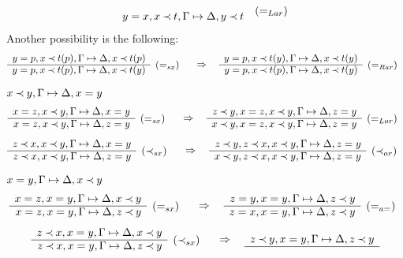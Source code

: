 \begin{PROOF}
\begin{LS}
\[\begin{array}{rl}
y=x, x\Incl t,\GSD,y\Incl t & \rabove{(=_{Lar})}
\end{array}
\]
Another possibility is the following:
\[ \begin{array}{rl}
y=p, x\Incl t(p),\GSD,x\Incl t(p) \\ \cline{1-1}
y=p, x\Incl t(p),\GSD,x\Incl t(y) & \rabove{(=_{sx})}
\end{array}
\conv
\begin{array}{rl}
y=p, x\Incl t(y),\GSD,x\Incl t(y) \\ \cline{1-1}
y=p, x\Incl t(p),\GSD,x\Incl t(y) & \rabove{(=_{Rar})}
\end{array}
\]
\item $x\mathbin{\prec} y,\Gamma\mathrel{\mapsto}\Delta,x=y$
\[ \begin{array}{rl}
x=z,x\Incl y,\GSD,x=y \\ \cline{1-1}
x=z,x\Incl y,\GSD,z=y & \rabove{(=_{sx})}
\end{array}
\conv
\begin{array}{rl}
z\Incl y,x=z,x\Incl y,\GSD,z=y \\ \cline{1-1}
x\Incl y,x=z,x\Incl y,\GSD,z=y & \rabove{(=_{Lar})}
\end{array}
\]
\[ \begin{array}{rl}
z\Incl x,x\Incl y,\GSD,x=y \\ \cline{1-1}
z\Incl x,x\Incl y,\GSD,z=y & \rabove{(\Incl_{sx})}
\end{array}
\conv
\begin{array}{rl}
z\Incl y,z\Incl x,x\Incl y,\GSD,z=y \\ \cline{1-1}
x\Incl y,z\Incl x,x\Incl y,\GSD,z=y & \rabove{(\Incl_{ar})}
\end{array}
\]
\item $x=y,\Gamma\mathrel{\mapsto}\Delta,x\mathbin{\prec} y$
\[ \begin{array}{rl}
x=z,x= y,\GSD,x\Incl y \\ \cline{1-1}
x=z,x= y,\GSD,z\Incl y & \rabove{(=_{sx})}
\end{array}
\conv
\begin{array}{rl}
z=y,x= y,\GSD,z\Incl y \\ \cline{1-1}
z=x,x= y,\GSD,z\Incl y & \rabove{(=_{a=})}
\end{array}
\]
\[ \begin{array}{rl}
z\Incl x,x=y,\GSD,x\Incl y \\ \cline{1-1}
z\Incl x,x=y,\GSD,z\Incl y & \rabove{(\Incl_{sx})}
\end{array}
\conv
\begin{array}{rl}
z\Incl y,x= y,\GSD,z\Incl y \\ \cline{1-1}

\end{array}\]
\end{LS}
\end{PROOF}
